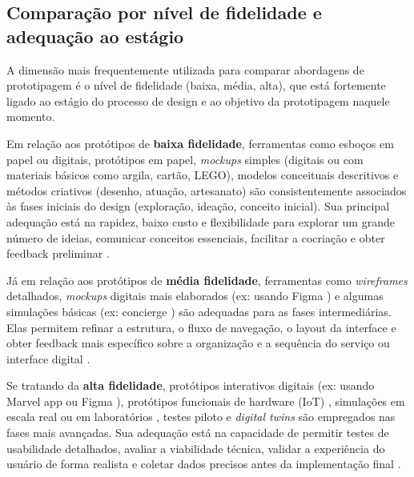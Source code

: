 \subsection{Comparação por nível de fidelidade e adequação ao estágio}

A dimensão mais frequentemente utilizada para comparar abordagens de prototipagem é o nível de fidelidade (baixa, média, alta), que está fortemente ligado ao estágio do processo de design e ao objetivo da prototipagem naquele momento.

Em relação aos protótipos de \textbf{baixa fidelidade}, ferramentas como esboços em papel ou digitais, protótipos em papel, \textit{mockups} simples (digitais ou com materiais básicos como argila, cartão, LEGO), modelos conceituais descritivos e métodos criativos (desenho, atuação, artesanato) são consistentemente associados às fases iniciais do design (exploração, ideação, conceito inicial). Sua principal adequação está na rapidez, baixo custo e flexibilidade para explorar um grande número de ideias, comunicar conceitos essenciais, facilitar a cocriação e obter feedback preliminar \cite{paust2025integrative, mager2023product, Vieira2025, asbjornsen2022echange, kumar2023rheumatology, lee2023industry, seko2024transitions, soto2023prototyping, villa2022integratedcare, Suryawati2024, wang2023smartproducts}.

Já em relação aos protótipos de \textbf{média fidelidade}, ferramentas como \textit{wireframes} detalhados, \textit{mockups} digitais mais elaborados (ex: usando Figma \cite{villa2022integratedcare}) e algumas simulações básicas (ex: concierge \cite{Suryawati2024}) são adequadas para as fases intermediárias. Elas permitem refinar a estrutura, o fluxo de navegação, o layout da interface e obter feedback mais específico sobre a organização e a sequência do serviço ou interface digital \cite{villa2022integratedcare, Suryawati2024, nguyen2022human}.

Se tratando da \textbf{alta fidelidade}, protótipos interativos digitais (ex: usando Marvel app \cite{asbjornsen2022echange} ou Figma \cite{villa2022integratedcare}), protótipos funcionais de hardware (IoT) \cite{Kim2024}, simulações em escala real ou em laboratórios \cite{seko2024transitions, soto2023prototyping, yan2022pssvalue}, testes piloto \cite{seko2024transitions} e \textit{digital twins} \cite{mager2023product} são empregados nas fases mais avançadas. Sua adequação está na capacidade de permitir testes de usabilidade detalhados, avaliar a viabilidade técnica, validar a experiência do usuário de forma realista e coletar dados precisos antes da implementação final \cite{paust2025integrative, asbjornsen2022echange, mager2023product, villa2022integratedcare, Kim2024}.

